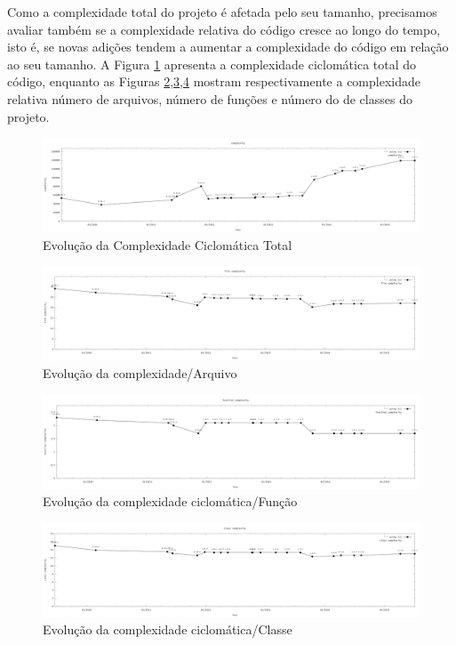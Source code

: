 Como a complexidade total do projeto é afetada pelo seu tamanho, precisamos avaliar também se a complexidade relativa do código cresce ao longo do tempo, isto é, se novas adições tendem a aumentar a complexidade do código em relação ao seu tamanho. A Figura \ref{fig:total_complexity} apresenta a complexidade ciclomática total do código, enquanto as Figuras \ref{fig:file_complexity},\ref{fig:functioncomplexity},\ref{fig:classcomplexity} mostram respectivamente a complexidade relativa número de arquivos, número de funções e número do de classes do projeto.
\begin{figure}[h]
	\centering
	\includegraphics[width=0.9\linewidth]{figure/complexity}
	\caption{Evolução da Complexidade Ciclomática Total}
	\label{fig:total_complexity}
\end{figure}
\begin{figure}[h]
	\centering
	\includegraphics[width=1\linewidth]{figure/file_complexity}
	\caption{Evolução da complexidade/Arquivo}
	\label{fig:file_complexity}
\end{figure}
\begin{figure}[h]
	\centering
	\includegraphics[width=1\linewidth]{figure/function_complexity}
	\caption{Evolução da complexidade ciclomática/Função}
	\label{fig:functioncomplexity}
\end{figure}
\begin{figure}[h]
	\centering
	\includegraphics[width=1\linewidth]{figure/class_complexity}
	\caption{Evolução da complexidade ciclomática/Classe}
	\label{fig:classcomplexity}
\end{figure}

